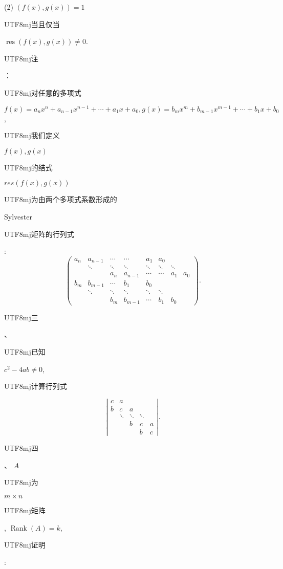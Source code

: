 \documentclass[10pt]{article}
\begin{document}
(2) $(f(x), g(x))=1$ \begin{CJK}{UTF8}{mj}当且仅当\end{CJK} $\operatorname{res}(f(x), g(x)) \neq 0$.

\begin{CJK}{UTF8}{mj}注\end{CJK}：\begin{CJK}{UTF8}{mj}对任意的多项式\end{CJK} $f(x)=a_{n} x^{n}+a_{n-1} x^{n-1}+\cdots+a_{1} x+a_{0}, g(x)=b_{m} x^{m}+b_{m-1} x^{m-1}+\cdots+b_{1} x+b_{0}$, \begin{CJK}{UTF8}{mj}我们定义\end{CJK} $f(x), g(x)$ \begin{CJK}{UTF8}{mj}的结式\end{CJK} $r e s(f(x), g(x))$ \begin{CJK}{UTF8}{mj}为由两个多项式系数形成的\end{CJK} Sylvester \begin{CJK}{UTF8}{mj}矩阵的行列式\end{CJK}:
$$
\left(\begin{array}{cccccccc}
a_{n} & a_{n-1} & \cdots & \cdots & a_{1} & a_{0} & & \\
& \ddots & \ddots & \ddots & \ddots & \ddots & \ddots & \\
& & a_{n} & a_{n-1} & \cdots & \cdots & a_{1} & a_{0} \\
b_{m} & b_{m-1} & \cdots & b_{1} & b_{0} & & & \\
& \ddots & \ddots & \ddots & \ddots & \ddots & & \\
& & b_{m} & b_{m-1} & \cdots & b_{1} & b_{0} &
\end{array}\right) .
$$
\begin{CJK}{UTF8}{mj}三\end{CJK}、\begin{CJK}{UTF8}{mj}已知\end{CJK} $c^{2}-4 a b \neq 0$, \begin{CJK}{UTF8}{mj}计算行列式\end{CJK}
$$
\left|\begin{array}{ccccc}
c & a & & & \\
b & c & a & & \\
& \ddots & \ddots & \ddots & \\
& & b & c & a \\
& & & b & c
\end{array}\right| .
$$
\begin{CJK}{UTF8}{mj}四\end{CJK}、 $A$ \begin{CJK}{UTF8}{mj}为\end{CJK} $m \times n$ \begin{CJK}{UTF8}{mj}矩阵\end{CJK}, $\operatorname{Rank}(A)=k$, \begin{CJK}{UTF8}{mj}证明\end{CJK}:
\end{document}
